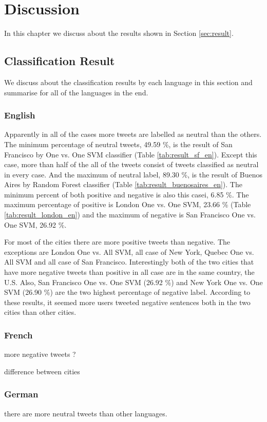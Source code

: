 \chapter{Discussion}
In this chapter we discuss about the results shown in Section \ref{sec:result}.
\section{Classification Result}
We discuss about the classification results by each language in this section and summarise for all of the languages in the end.
\subsection{English}
Apparently in all of the cases more tweets are labelled as neutral than the others.
The minimum percentage of neutral tweets, 49.59 \%, is the result of San Francisco by One vs. One SVM classifier (Table \ref{tab:result_sf_en}).
Except this case, more than half of the all of the tweets consist of tweets classified as neutral in every case.
And the maximum of neutral label, 89.30 \%, is the result of Buenos Aires by Random Forest classifier (Table \ref{tab:result_buenosaires_en}).
The minimum percent of both positive and negative is also this casei, 6.85 \%.
The maximum percentage of positive is London One vs. One SVM, 23.66 \% (Table \ref{tab:result_london_en}) and the maximum of negative is San Francisco One vs. One SVM, 26.92 \%.


For most of the cities there are more positive tweets than negative.
The exceptions are London One vs. All SVM, all case of New York, Quebec One vs. All SVM and all case of San Francisco.
Interestingly both of the two cities that have more negative tweets than positive in all case are in the same country, the U.S.
Also, San Francisco One vs. One SVM (26.92 \%) and New York One vs. One SVM (26.90 \%) are the two highest percentage of negative label.
According to these results, it seemed more users tweeted negative sentences both in the two cities than other cities.
\subsection{French}
more negative tweets ?

difference between cities
\subsection{German}
there are more neutral tweets than other languages.

